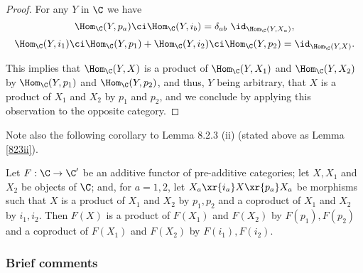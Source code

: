 \documentclass[12pt]{article}
\theoremstyle{remark}
\theoremstyle{definition}
\begin{document}
\begin{proof}
For any $Y$ in $\C$ we have 
$$
\Hom_\C(Y,p_a)\ci\Hom_\C(Y,i_b)=\delta_{ab}\ \id_{\Hom_\C(Y,X_a)},
$$ 
$$
\Hom_\C(Y,i_1)\ci\Hom_\C(Y,p_1)+\Hom_\C(Y,i_2)\ci\Hom_\C(Y,p_2)=\id_{\Hom_\C(Y,X)}.
$$ 

\nn This implies that $\Hom_\C(Y,X)$ is a product of $\Hom_\C(Y,X_1)$ and $\Hom_\C(Y,X_2)$ by $\Hom_\C(Y,p_1)$ and $\Hom_\C(Y,p_2)$, and thus, $Y$ being arbitrary, that $X$ is a product of $X_1$ and $X_2$ by $p_1$ and $p_2$, and we conclude by applying this observation to the opposite category.
\end{proof}

Note also the following corollary to Lemma 8.2.3 (ii) (stated above as Lemma \ref{823ii}). 

\begin{cor}
Let $F:\C\to\C'$ be an additive functor of pre-additive categories; let $X,X_1$ and $X_2$ be objects of $\C$; and, for $a=1,2$, let $X_a\xr{i_a}X\xr{p_a}X_a$ be morphisms such that $X$ is a product of $X_1$ and $X_2$ by $p_1,p_2$ and a coproduct of $X_1$ and $X_2$ by $i_1,i_2$. Then $F(X)$ is a product of $F(X_1)$ and $F(X_2)$ by $F(p_1),F(p_2)$ and a coproduct of $F(X_1)$ and $F(X_2)$ by $F(i_1),F(i_2)$. 
\end{cor}


\subsubsection{Brief comments}
\end{document}
